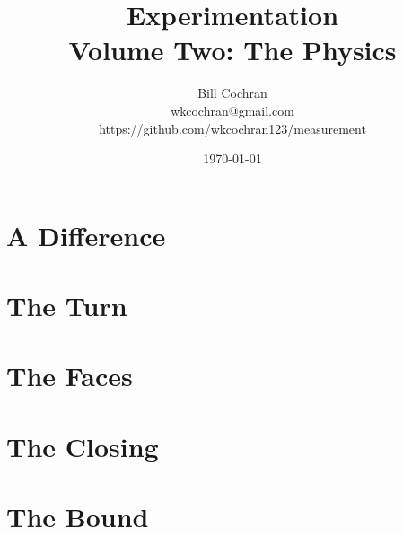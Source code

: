 \documentclass[12pt,oneside]{book}
\begin{document}
\title{Experimentation\\[0.4em]\large Volume Two: The Physics}
\author{Bill Cochran\\wkcochran@gmail.com\\https://github.com/wkcochran123/measurement}
\date{\today}
\maketitle

\frontmatter
\onehalfspacing
\tableofcontents



\mainmatter

\part{A Difference}




\part{The Turn}




\part{The Faces}




\part{The Closing}




\part{The Bound}




\backmatter
\printbibliography
\end{document}
